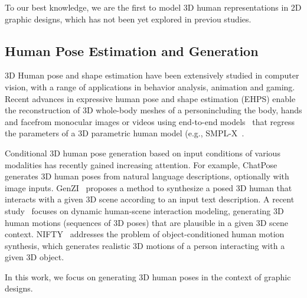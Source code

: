 To our best knowledge, we are the first to model 3D human representations in 2D graphic designs, which has not been yet explored in previou studies.

\subsection{Human Pose Estimation and Generation}

3D Human pose and shape estimation
have been extensively studied in computer vision, with a range of applications in behavior analysis, animation and gaming.
Recent advances in expressive human pose and shape estimation (EHPS) enable the reconstruction of 3D whole-body meshes of a person\textemdash including the body, hands and face\textemdash from monocular images or videos using end-to-end models~\cite{OSX,cai2023smplerx,aios} 
that regress the parameters of a 3D parametric human model (e.g., SMPL-X~\cite{SMPLX}.

Conditional 3D human pose generation based on input conditions of various modalities has recently gained increasing attention. For example, ChatPose~\cite{feng2024chatpose} generates 3D human poses from natural language descriptions, optionally with image inputs. GenZI~\cite{li2024genzi} proposes a method to synthesize a posed 3D human that interacts with a given 3D scene according to an input text description. A recent study~\cite{jiang2024scaling} focuses on dynamic human-scene interaction modeling, generating 3D human motions (sequences of 3D poses) that are plausible in a given 3D scene context. NIFTY~\cite{kulkarni2024nifty} addresses the problem of object-conditioned human motion synthesis, which generates realistic 3D motions of a person interacting with a given 3D object.

In this work, we focus on generating 3D human poses in the context of graphic designs.

